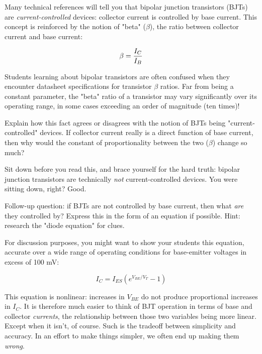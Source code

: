 

Many technical references will tell you that bipolar junction transistors (BJTs) are {\it current-controlled} devices: collector current is controlled by base current.  This concept is reinforced by the notion of "beta" ($\beta$), the ratio between collector current and base current:

$$\beta = {I_C \over I_B}$$

Students learning about bipolar transistors are often confused when they encounter datasheet specifications for transistor $\beta$ ratios.  Far from being a constant parameter, the "beta" ratio of a transistor may vary significantly over its operating range, in some cases exceeding an order of magnitude (ten times)!

Explain how this fact agrees or disagrees with the notion of BJTs being "current-controlled" devices.  If collector current really is a direct function of base current, then why would the constant of proportionality between the two ($\beta$) change so much?







Sit down before you read this, and brace yourself for the hard truth: bipolar junction transistors are technically {\it not} current-controlled devices.  You were sitting down, right?  Good.

\vskip 10pt

Follow-up question: if BJTs are not controlled by base current, then what {\it are} they controlled by?  Express this in the form of an equation if possible.  Hint: research the "diode equation" for clues.







For discussion purposes, you might want to show your students this equation, accurate over a wide range of operating conditions for base-emitter voltages in excess of 100 mV:

$$I_C = I_{ES} \left( e^{V_{BE} / V_T} - 1 \right) $$

This equation is nonlinear: increases in $V_{BE}$ do not produce proportional increases in $I_C$.  It is therefore much easier to think of BJT operation in terms of base and collector {\it currents}, the relationship between those two variables being more linear.  Except when it isn't, of course.  Such is the tradeoff between simplicity and accuracy.  In an effort to make things simpler, we often end up making them {\it wrong}.

